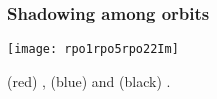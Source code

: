 
\begin{frame}%
  \frametitle{Shadowing among orbits}
  
  {\centering
    \texttt{[image: rpo1rpo5rpo22Im]} 
    \par}
  {\scriptsize 
    (red) , (blue) 
    and (black) . 
  }

\end{frame}


